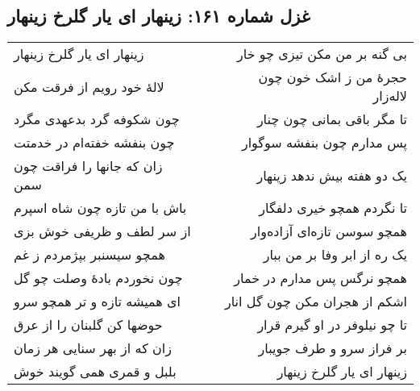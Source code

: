 \begin{center}
\section*{غزل شماره ۱۶۱: زینهار ای یار گلرخ زینهار}
\label{sec:161}
\begin{longtable}{l p{0.5cm} r}
زینهار ای یار گلرخ زینهار
&&
بی گنه بر من مکن تیزی چو خار
\\
لالهٔ خود رویم از فرقت مکن
&&
حجرهٔ من ز اشک خون چون لاله‌زار
\\
چون شکوفه گرد بدعهدی مگرد
&&
تا مگر باقی بمانی چون چنار
\\
چون بنفشه خفته‌ام در خدمتت
&&
پس مدارم چون بنفشه سوگوار
\\
زان که جانها را فراقت چون سمن
&&
یک دو هفته بیش ندهد زینهار
\\
باش با من تازه چون شاه اسپرم
&&
تا نگردم همچو خیری دلفگار
\\
از سر لطف و ظریفی خوش بزی
&&
همچو سوسن تازه‌ای آزاده‌وار
\\
همچو سیسنبر بپژمردم ز غم
&&
یک ره از ابر وفا بر من ببار
\\
چون نخوردم بادهٔ وصلت چو گل
&&
همچو نرگس پس مدارم در خمار
\\
ای همیشه تازه و تر همچو سرو
&&
اشکم از هجران مکن چون گل انار
\\
حوضها کن گلبنان را از عرق
&&
تا چو نیلوفر در او گیرم قرار
\\
زان که از بهر سنایی هر زمان
&&
بر فراز سرو و طرف جویبار
\\
بلبل و قمری همی گویند خوش
&&
زینهار ای یار گلرخ زینهار
\\
\end{longtable}
\end{center}
